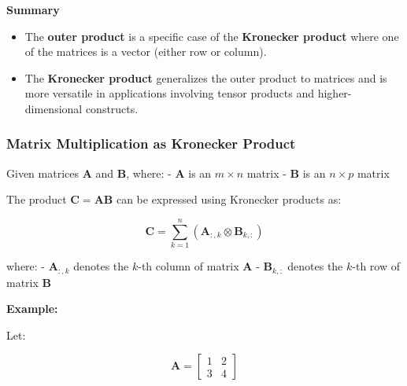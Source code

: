 \documentclass[
  letterpaper,
  DIV=11,
  numbers=noendperiod]{scrreprt}
\providecommand{\tightlist}{%
  \setlength{\itemsep}{0pt}\setlength{\parskip}{0pt}}\usepackage{longtable,booktabs,array}
\theoremstyle{plain}
\theoremstyle{definition}
\theoremstyle{remark}
\begin{document}
\begin{tcolorbox}[enhanced jigsaw, leftrule=.75mm, bottomtitle=1mm, colback=white, toptitle=1mm, opacitybacktitle=0.6, toprule=.15mm, colbacktitle=quarto-callout-note-color!10!white, arc=.35mm, colframe=quarto-callout-note-color-frame, title=\textcolor{quarto-callout-note-color}{\faInfo}\hspace{0.5em}{Note}, titlerule=0mm, rightrule=.15mm, left=2mm, bottomrule=.15mm, breakable, coltitle=black, opacityback=0]

\textbf{Summary}

\begin{itemize}
\tightlist
\item
  The \textbf{outer product} is a specific case of the \textbf{Kronecker
  product} where one of the matrices is a vector (either row or column).
\item
  The \textbf{Kronecker product} generalizes the outer product to
  matrices and is more versatile in applications involving tensor
  products and higher-dimensional constructs.
\end{itemize}

\end{tcolorbox}

\subsubsection*{Matrix Multiplication as Kronecker
Product}\label{matrix-multiplication-as-kronecker-product}

Given matrices \(\mathbf{A}\) and \(\mathbf{B}\), where: -
\(\mathbf{A}\) is an \(m \times n\) matrix - \(\mathbf{B}\) is an
\(n \times p\) matrix

The product \(\mathbf{C} = \mathbf{A} \mathbf{B}\) can be expressed
using Kronecker products as:

\[\mathbf{C} = \sum_{k=1}^n (\mathbf{A}_{:,k} \otimes \mathbf{B}_{k,:})\]

where: - \(\mathbf{A}_{:,k}\) denotes the \(k\)-th column of matrix
\(\mathbf{A}\) - \(\mathbf{B}_{k,:}\) denotes the \(k\)-th row of matrix
\(\mathbf{B}\)

\textbf{Example:}

Let:

\[\mathbf{A} = \begin{bmatrix}1 & 2 \\3 & 4\end{bmatrix}\]
\end{document}
